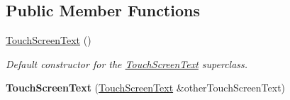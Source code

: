 \subsection*{Public Member Functions}
\begin{DoxyCompactItemize}
\item 
\hyperlink{class_touch_screen_text_ab4eb34ba6e6d41dbcbc00377f497efb8}{Touch\+Screen\+Text} ()
\begin{DoxyCompactList}\small\item\em Default constructor for the \hyperlink{class_touch_screen_text}{Touch\+Screen\+Text} superclass. \end{DoxyCompactList}\item 
\hypertarget{class_touch_screen_text_ab1d335963b16d5c06182002d32b485dc}{{\bfseries Touch\+Screen\+Text} (\hyperlink{class_touch_screen_text}{Touch\+Screen\+Text} \&other\+Touch\+Screen\+Text)}\label{class_touch_screen_text_ab1d335963b16d5c06182002d32b485dc}


\end{DoxyCompactItemize}
